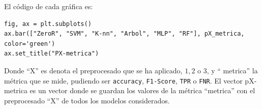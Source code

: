 \documentclass[a4]{article}
\begin{document}
\begin{figure}[H]
  \centering
\end{figure}

\vspace{-5mm}

El código de cada gráfica es:

\begin{lstlisting}
fig, ax = plt.subplots()
ax.bar(["ZeroR", "SVM", "K-nn", "Arbol", "MLP", "RF"], pX_metrica, color='green')
ax.set_title("PX-metrica")
\end{lstlisting}

Donde ``X'' es denota el preprocesado que se ha aplicado, $1, 2$ o $3$, y `` metrica'' la métrica que se mide, pudiendo ser \texttt{accuracy}, \texttt{F1-Score}, \texttt{TPR} o \texttt{FNR}. El vector pX-metrica es un vector donde se guardan los valores de la métrica ``metrica'' con el preprocesado ``X'' de todos los modelos considerados.
\end{document}

